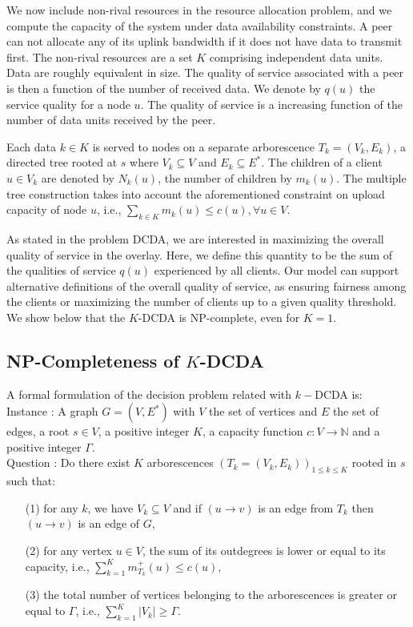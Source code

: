 We now include non-rival resources in the resource allocation problem,
and we compute the capacity of the system under data availability
constraints. A peer can not allocate any of its uplink bandwidth if it
does not have data to transmit first. The non-rival resources are a
set $K$ comprising independent data units. Data are roughly equivalent
in size. The quality of service associated with a peer is then a
function of the number of received data. We denote by $q(u)$ the
service quality for a node $u$. The quality of service is a increasing
function of the number of data units received by the peer.

Each data $k \in K$ is served to nodes on a separate arborescence
$T_k=(V_k,E_k)$, a directed tree rooted at $s$ where $V_k \subseteq V$
and $E_k \subseteq E^\ast$. The children of a client $u \in V_k$ are
denoted by $N_k(u)$, the number of children by $m_k(u)$. The multiple
tree construction takes into account the aforementioned constraint on
upload capacity of node $u$, i.e., $\sum_{k\in K} m_k(u) \leq c(u),
\forall u \in V$.

As stated in the problem DCDA, we are interested in maximizing the
overall quality of service in the overlay. Here, we define this
quantity to be the sum of the qualities of service $q(u)$ experienced
by all clients. Our model can support alternative definitions of the
overall quality of service, as ensuring fairness among the clients or
maximizing the number of clients up to a given quality threshold. We
show below that the $K$-DCDA is NP-complete, even for $K = 1$.

\subsection{NP-Completeness of $K$-DCDA}

A formal formulation of the decision problem related with $k-$DCDA is: \\
{\sc Instance :} A graph $G=(V,E^\ast)$ with $V$ the set of vertices and $E$ the set of edges, a root $s\in V$, a positive integer $K$, a capacity function $c:V \longrightarrow {\mathbb N}$ and a positive integer $\Gamma$.\\
{\sc Question :} Do there exist $K$ arborescences $\left
  (T_k=(V_k,E_k) \right )_{1\leq k\leq K}$ rooted in $s$ such that:
\begin{itemize}
\item[(1)] for any $k$, we have $V_k\subseteq V$ and if $(u \rightarrow
  v)$ is an edge from $T_k$ then $(u \rightarrow v)$ is an edge of $G$,
\item[(2)] for any vertex $u\in V$, the sum of its outdegrees is
  lower or equal to its capacity, i.e., $\sum_{k=1}^K m^+_{T_k}(u)
  \leq c(u)$,
\item[(3)] the total number of vertices belonging to the
  arborescences is greater or equal to $\Gamma$, i.e., $\sum_{k=1}^K
  |V_k| \geq \Gamma$.
\end{itemize}






